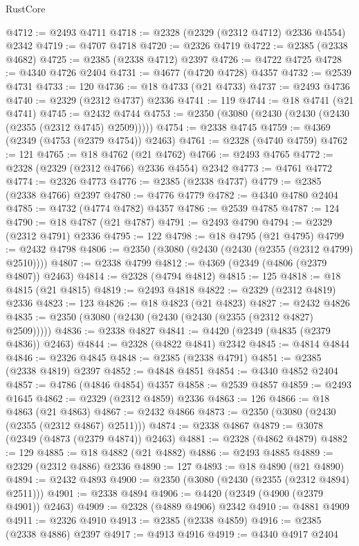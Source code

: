 \begin{lexlean}{RustCore}
\begin{coremodule}
@4712 := @2493 @4711
@4718 := @2328 (@2329 (@2312 @4712) @2336 @4554) @2342
@4719 := @4707 @4718
@4720 := @2326 @4719
@4722 := @2385 (@2338 @4682)
@4725 := @2385 (@2338 @4712) @2397
@4726 := @4722 @4725
@4728 := @4340 @4726 @2404
@4731 := @4677 (@4720 @4728) @4357
@4732 := @2539 @4731
@4733 := 120
@4736 := @18 @4733 (@21 @4733)
@4737 := @2493 @4736
@4740 := @2329 (@2312 @4737) @2336
@4741 := 119
@4744 := @18 @4741 (@21 @4741)
@4745 := @2432 @4744
@4753 := @2350 (@3080 (@2430 (@2430 (@2430 (@2355 (@2312 @4745) @2509)))))
@4754 := @2338 @4745
@4759 := @4369 (@2349 (@4753 (@2379 @4754)) @2463)
@4761 := @2328 (@4740 @4759)
@4762 := 121
@4765 := @18 @4762 (@21 @4762)
@4766 := @2493 @4765
@4772 := @2328 (@2329 (@2312 @4766) @2336 @4554) @2342
@4773 := @4761 @4772
@4774 := @2326 @4773
@4776 := @2385 (@2338 @4737)
@4779 := @2385 (@2338 @4766) @2397
@4780 := @4776 @4779
@4782 := @4340 @4780 @2404
@4785 := @4732 (@4774 @4782) @4357
@4786 := @2539 @4785
@4787 := 124
@4790 := @18 @4787 (@21 @4787)
@4791 := @2493 @4790
@4794 := @2329 (@2312 @4791) @2336
@4795 := 122
@4798 := @18 @4795 (@21 @4795)
@4799 := @2432 @4798
@4806 := @2350 (@3080 (@2430 (@2430 (@2355 (@2312 @4799) @2510))))
@4807 := @2338 @4799
@4812 := @4369 (@2349 (@4806 (@2379 @4807)) @2463)
@4814 := @2328 (@4794 @4812)
@4815 := 125
@4818 := @18 @4815 (@21 @4815)
@4819 := @2493 @4818
@4822 := @2329 (@2312 @4819) @2336
@4823 := 123
@4826 := @18 @4823 (@21 @4823)
@4827 := @2432 @4826
@4835 := @2350 (@3080 (@2430 (@2430 (@2430 (@2355 (@2312 @4827) @2509)))))
@4836 := @2338 @4827
@4841 := @4420 (@2349 (@4835 (@2379 @4836)) @2463)
@4844 := @2328 (@4822 @4841) @2342
@4845 := @4814 @4844
@4846 := @2326 @4845
@4848 := @2385 (@2338 @4791)
@4851 := @2385 (@2338 @4819) @2397
@4852 := @4848 @4851
@4854 := @4340 @4852 @2404
@4857 := @4786 (@4846 @4854) @4357
@4858 := @2539 @4857
@4859 := @2493 @1645
@4862 := @2329 (@2312 @4859) @2336
@4863 := 126
@4866 := @18 @4863 (@21 @4863)
@4867 := @2432 @4866
@4873 := @2350 (@3080 (@2430 (@2355 (@2312 @4867) @2511)))
@4874 := @2338 @4867
@4879 := @3078 (@2349 (@4873 (@2379 @4874)) @2463)
@4881 := @2328 (@4862 @4879)
@4882 := 129
@4885 := @18 @4882 (@21 @4882)
@4886 := @2493 @4885
@4889 := @2329 (@2312 @4886) @2336
@4890 := 127
@4893 := @18 @4890 (@21 @4890)
@4894 := @2432 @4893
@4900 := @2350 (@3080 (@2430 (@2355 (@2312 @4894) @2511)))
@4901 := @2338 @4894
@4906 := @4420 (@2349 (@4900 (@2379 @4901)) @2463)
@4909 := @2328 (@4889 @4906) @2342
@4910 := @4881 @4909
@4911 := @2326 @4910
@4913 := @2385 (@2338 @4859)
@4916 := @2385 (@2338 @4886) @2397
@4917 := @4913 @4916
@4919 := @4340 @4917 @2404

\end{coremodule}
\end{lexlean}
